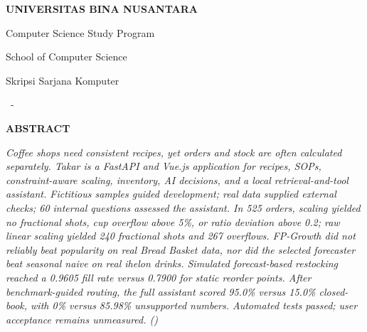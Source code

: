 \thispagestyle{plain}

\edef\abstrakRightHyphenMin{\the\righthyphenmin}

\begin{singlespace}
{\centering
    \textbf{UNIVERSITAS BINA NUSANTARA}\par
    \vspace{0.18 cm}
    Computer Science Study Program\par
    School of Computer Science\par
    Skripsi Sarjana Komputer\par
    \vspace{0.2 cm}
    \bo{\JudulIndo}\par
    \vspace{0.1 cm}
    \penulisSatu\ - \NIMpenulisSatu\par
}

{\centering\fontsize{16}{19}\selectfont\textbf{ABSTRACT}\par}

\vspace{0.08 cm}

{\centering\itshape\JudulInggris\par}

\vspace{0.1 cm}

{\itshape
\noindent Coffee shops need consistent recipes, yet orders and stock are often calculated separately. Takar is a FastAPI and Vue.js application for recipes, SOPs, constraint-aware scaling, inventory, AI decisions, and a local retrieval-and-tool assistant. Fictitious samples guided development; real data supplied external checks; 60 internal questions assessed the assistant. In 525 orders, scaling yielded no fractional shots, cup overflow above 5\%, or ratio deviation above 0.2; raw linear scaling yielded 240 fractional shots and 267 overflows. FP-Growth did not reliably beat popularity on real Bread Basket data, nor did the selected forecaster beat seasonal naive on real ihelon drinks. Simulated forecast-based restocking reached a 0.9605 fill rate versus 0.7900 for static reorder points. After benchmark-guided routing, the full assistant scored 95.0\% versus 15.0\% closed-book, with 0\% versus 85.98\% unsupported numbers. Automated tests passed; user acceptance remains unmeasured. (\inisialPenulis)

}
\end{singlespace}
